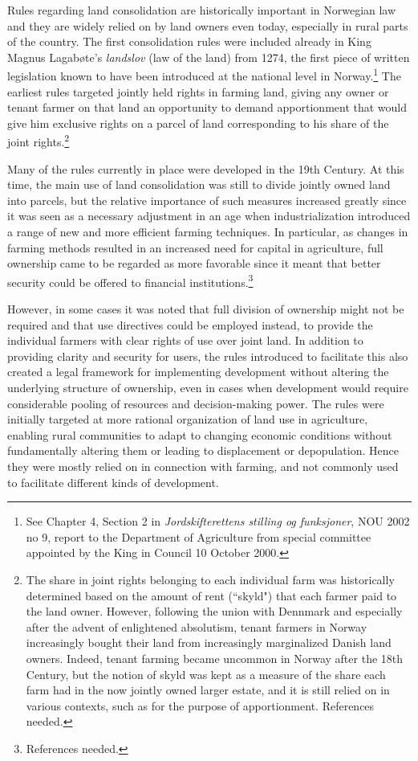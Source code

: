 Rules regarding land consolidation are historically important in Norwegian law and they are widely relied on by land owners even today, especially in rural parts of the country. The first consolidation rules were included already in King Magnus Lagabøte's \emph{landslov} (law of the land) from 1274, the first piece of written legislation known to have been introduced at the national level in Norway.\footnote{See Chapter 4, Section 2 in \emph{Jordskifterettens stilling og funksjoner}, NOU 2002 no 9, report to the Department of Agriculture from special committee appointed by the King in Council 10 October 2000.} The earliest rules targeted jointly held rights in farming land, giving any owner or tenant farmer on that land an opportunity to demand apportionment that would give him exclusive rights on a parcel of land corresponding to his share of the joint rights.\footnote{The share in joint rights belonging to each individual farm was historically determined based on the amount of rent (``skyld") that each farmer paid to the land owner. However, following the union with Dennmark and especially after the advent of enlightened absolutism, tenant farmers in Norway increasingly bought their land from increasingly marginalized Danish land owners. Indeed, tenant farming became uncommon in Norway after the 18th Century, but the notion of skyld was kept as a measure of the share each farm had in the now jointly owned larger estate, and it is still relied on in various contexts, such as for the purpose of apportionment. References needed.}

Many of the rules currently in place were developed in the 19th Century. At this time, the main use of land consolidation was still to divide jointly owned land into parcels, but the relative importance of such measures increased greatly since it was seen as a necessary adjustment in an age when industrialization introduced a range of new and more efficient farming techniques. In particular, as changes in farming methods resulted in an increased need for capital in agriculture, full ownership came to be regarded as more favorable since it meant that better security could be offered to financial institutions.\footnote{References needed.} 

However, in some cases it was noted that full division of ownership might not be required and that use directives could be employed instead, to provide the individual farmers with clear rights of use over joint land. In addition to providing clarity and security for users, the rules introduced to facilitate this also created a legal framework for implementing development without altering the underlying structure of ownership, even in cases when development would require considerable pooling of resources and decision-making power. The rules were initially targeted at more rational organization of land use in agriculture, enabling rural communities to adapt to changing economic conditions without fundamentally altering them or leading to displacement or depopulation. Hence they were mostly relied on in connection with farming, and not commonly used to facilitate different kinds of development.

